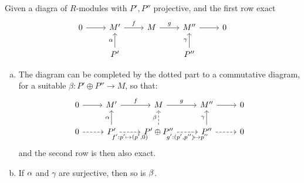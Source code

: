 \documentclass[a4paper]{report}
\begin{document}
\begin{thm} Given a diagra of $R$-modules with $P', P''$ projective, and the first row exact
  \[\begin{tikzcd}
0 \arrow[r] & M' \arrow[r, "f"]  & M \arrow[r, "g"] & M'' \arrow[r]           & 0 \\
            & P' \arrow[u, "\a"] &                  & P'' \arrow[u, "\gamma"] &
\end{tikzcd}\]
\begin{enumerate}[(a)]
  \item The diagram can be completed by the dotted part to a commutative diagram, for a suitable $\beta: P' \oplus P'' \to M$, so that:
        \[\begin{tikzcd}
0 \arrow[r]         & M' \arrow[r, "f"]                                             & M \arrow[r, "g"]                                                                    & M'' \arrow[r]                             & 0 \\
0 \arrow[r, dashed] & P' \arrow[u, "\a"] \arrow[r, "{f': p' \mps (p',0)}"', dashed] & P' \oplus P'' \arrow[u, "\b", dashed] \arrow[r, "{g': (p',p'') \mps p''}"', dashed] & P'' \arrow[u, "\gamma"] \arrow[r, dashed] & 0
\end{tikzcd}\] and the second row is then also exact.
        \item If $\alpha$ and $\gamma$ are surjective, then so is $\beta$.
\end{enumerate}
\end{thm}
\end{document}
